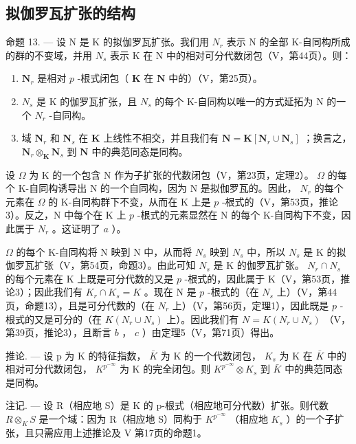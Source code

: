 \subsection{拟伽罗瓦扩张的结构}

命题 13. --- 设 N 是 K 的拟伽罗瓦扩张。我们用 \(N_{r}\) 表示 N 的全部 K-自同构所成的群的不变域，并用 \(N_{s}\) 表示 K 在 N 中的相对可分代数闭包（V，第44页）。则：

\begin{enumerate}
\def\labelenumi{\alph{enumi})}
\item
  \(\mathbf{N}_r\) 是相对 \(p\) -根式闭包（ \(\mathbf{K}\) 在 \(\mathbf{N}\) 中的）（V，第25页）。
\item
  \(N_{s}\) 是 K 的伽罗瓦扩张，且 \(N_{s}\) 的每个 K-自同构以唯一的方式延拓为 N 的一个 \(N_{r}\) -自同构。
\item
  域 \(\mathbf{N}_r\) 和 \(\mathbf{N}_s\) 在 \(\mathbf{K}\) 上线性不相交，并且我们有 \(\mathbf{N} = \mathbf{K}[\mathbf{N}_r \cup \mathbf{N}_s]\) ；换言之， \(\mathbf{N}_r \otimes_{\mathbf{K}} \mathbf{N}_s\) 到 \(\mathbf{N}\) 中的典范同态是同构。
\end{enumerate}

设 \(\Omega\) 为 K 的一个包含 N 作为子扩张的代数闭包（V，第23页，定理2）。 \(\Omega\) 的每个 K-自同构诱导出 N 的一个自同构，因为 N 是拟伽罗瓦的。因此， \(N_r\) 的每个元素在 \(\Omega\) 的 K-自同构群下不变，从而在 K 上是 \(p\) -根式的（V，第53页，推论3）。反之，N 中每个在 K 上 \(p\) -根式的元素显然在 N 的每个 K-自同构下不变，因此属于 \(N_r\) 。这证明了 \(a\) ）。

 \(\Omega\) 的每个 K-自同构将 N 映到 N 中，从而将 \(N_s\) 映到 \(N_s\) 中，所以 \(N_s\) 是 K 的拟伽罗瓦扩张（V，第54页，命题3）。由此可知 \(N_s\) 是 K 的伽罗瓦扩张。 \(N_r \cap N_s\) 的每个元素在 K 上既是可分代数的又是 \(p\) -根式的，因此属于 K（V，第53页，推论3）；因此我们有 \(K_r \cap K_s = K\) 。现在 N 是 \(p\) -根式的（在 \(N_s\) 上）（V，第44页，命题13），且是可分代数的（在 \(N_r\) 上）（V，第56页，定理1），因此既是 \(p\) -根式的又是可分的（在 \(K(N_r \cup N_s)\) 上）。因此我们有 \(N = K(N_r \cup N_s)\) （V，第39页，推论3），且断言 \(b\) ， \(c\) ）由定理5（V，第71页）得出。

推论. --- 设 p 为 K 的特征指数， \(\bar{K}\) 为 K 的一个代数闭包， \(K_{s}\) 为 K 在 \(\bar{K}\) 中的相对可分代数闭包， \(K^{p^{-\infty}}\) 为 K 的完全闭包。则 \(K^{p^{-\infty}} \otimes K_{s}\) 到 \(\bar{K}\) 中的典范同态是同构。

注记. --- 设 R（相应地 S）是 K 的 p-根式（相应地可分代数）扩张。则代数 \(R \otimes_{K} S\) 是一个域：因为 R（相应地 S）同构于 \(K^{p^{-\infty}}\) （相应地 \(K_{s}\) ）的一个子扩张，且只需应用上述推论及 V 第17页的命题1。

